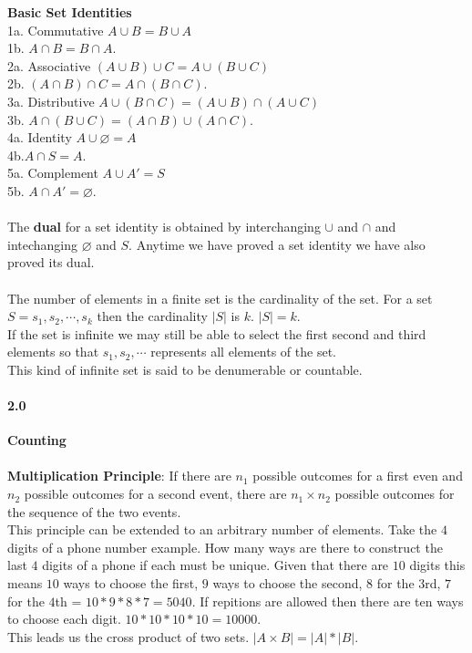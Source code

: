 \documentclass[14pt]{extreport}
\begin{document}
\textbf{Basic Set Identities}\\
1a. Commutative $A \cup B = B \cup A$ \\
1b. $A \cap B = B \cap A$.\\
2a. Associative $(A \cup B) \cup C = A \cup (B \cup C)$ \\
2b. $(A \cap B) \cap C = A \cap (B \cap C)$.\\
3a. Distributive $A \cup (B \cap C) = (A \cup B) \cap (A \cup C)$ \\
3b. $A \cap (B \cup C) = (A \cap B) \cup (A \cap C)$.\\
4a. Identity $A \cup \varnothing = A$ \\
4b.$ A \cap S = A$.\\
5a. Complement $ A \cup A' = S$ \\
5b. $A \cap A' = \varnothing$.\\\\

The \textbf{dual} for a set identity is obtained by interchanging $\cup$ and $\cap$ and intechanging $\varnothing$ and $S$. Anytime we have proved a set identity we have also proved
its dual.\\\\

The number of elements in a finite set is the cardinality of the set. For a set $S = {s_1, s_2, \cdots, s_k}$ then the cardinality $|S|$ is $k$. $|S| = k$.\\
If the set is infinite we may still be able to select the first second and third elements so that $s_1, s_2, \cdots$ represents all elements of the set.\\
This kind of infinite set is said to be denumerable or countable.

\paragraph{2.0} \textbf{Counting}\\\\

\textbf{Multiplication Principle}: If there are $n_1$ possible outcomes for a first even and $n_2$ possible outcomes for a second event, there are $n_1 \times n_2$ possible outcomes for the sequence of the two events.\\
This principle can be extended to an arbitrary number of elements. Take the $4$ digits of a phone number example. How many ways are there to construct the last $4$ digits of a phone if each must be unique.
Given that there are $10$ digits this means $10$ ways to choose the first, $9$ ways to choose the second, $8$ for the $3$rd, $7$ for the $4$th = $10 * 9 * 8 * 7 = 5040$. If repitions are allowed then there are ten
ways to choose each digit. $10*10*10*10 = 10000$.\\
This leads us the cross product of two sets. $ |A \times B| = |A| * |B|$.\\\\
\end{document}
